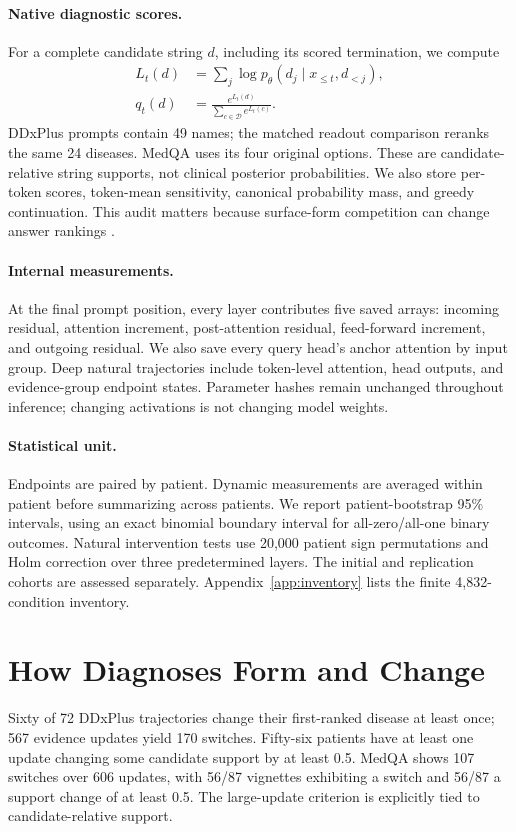 \documentclass[11pt]{article}
\begin{document}
\paragraph{Native diagnostic scores.}
For a complete candidate string $d$, including its scored termination, we compute
\begin{align}
 L_t(d)&=\sum_j \log p_\theta(d_j\mid x_{\leq t},d_{<j}),\\
 q_t(d)&=\frac{e^{L_t(d)}}{\sum_{c\in\mathcal D}e^{L_t(c)}}.
\end{align}
DDxPlus prompts contain 49 names; the matched readout comparison reranks the same 24 diseases. MedQA uses its four original options. These are candidate-relative string supports, not clinical posterior probabilities. We also store per-token scores, token-mean sensitivity, canonical probability mass, and greedy continuation. This audit matters because surface-form competition can change answer rankings \citep{surface}.

\paragraph{Internal measurements.}
At the final prompt position, every layer contributes five saved arrays: incoming residual, attention increment, post-attention residual, feed-forward increment, and outgoing residual. We also save every query head's anchor attention by input group. Deep natural trajectories include token-level attention, head outputs, and evidence-group endpoint states. Parameter hashes remain unchanged throughout inference; changing activations is not changing model weights.

\paragraph{Statistical unit.}
Endpoints are paired by patient. Dynamic measurements are averaged within patient before summarizing across patients. We report patient-bootstrap 95\% intervals, using an exact binomial boundary interval for all-zero/all-one binary outcomes. Natural intervention tests use 20,000 patient sign permutations and Holm correction over three predetermined layers. The initial and replication cohorts are assessed separately. Appendix~\ref{app:inventory} lists the finite 4,832-condition inventory.

\section{How Diagnoses Form and Change}
Sixty of 72 DDxPlus trajectories change their first-ranked disease at least once; 567 evidence updates yield 170 switches. Fifty-six patients have at least one update changing some candidate support by at least 0.5. MedQA shows 107 switches over 606 updates, with 56/87 vignettes exhibiting a switch and 56/87 a support change of at least 0.5. The large-update criterion is explicitly tied to candidate-relative support.
\end{document}
